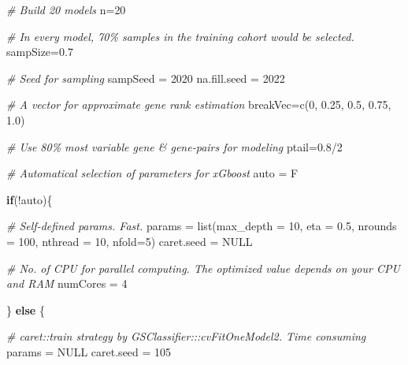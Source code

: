 \documentclass[
  12pt,
]{book}
\newenvironment{Shaded}{\begin{snugshade}}{\end{snugshade}}
\newcommand{\AttributeTok}[1]{\textcolor[rgb]{0.77,0.63,0.00}{#1}}
\newcommand{\CommentTok}[1]{\textcolor[rgb]{0.56,0.35,0.01}{\textit{#1}}}
\newcommand{\ConstantTok}[1]{\textcolor[rgb]{0.00,0.00,0.00}{#1}}
\newcommand{\ControlFlowTok}[1]{\textcolor[rgb]{0.13,0.29,0.53}{\textbf{#1}}}
\newcommand{\DecValTok}[1]{\textcolor[rgb]{0.00,0.00,0.81}{#1}}
\newcommand{\FloatTok}[1]{\textcolor[rgb]{0.00,0.00,0.81}{#1}}
\newcommand{\FunctionTok}[1]{\textcolor[rgb]{0.00,0.00,0.00}{#1}}
\newcommand{\NormalTok}[1]{#1}
\newcommand{\OtherTok}[1]{\textcolor[rgb]{0.56,0.35,0.01}{#1}}
\newcommand{\SpecialCharTok}[1]{\textcolor[rgb]{0.00,0.00,0.00}{#1}}
\begin{document}
\begin{Shaded}
\begin{Highlighting}[]

\CommentTok{\# Build 20 models}
\NormalTok{n}\OtherTok{=}\DecValTok{20} 

\CommentTok{\# In every model, 70\% samples in the training cohort would be selected. }
\NormalTok{sampSize}\OtherTok{=}\FloatTok{0.7}

\CommentTok{\# Seed for sampling}
\NormalTok{sampSeed }\OtherTok{=} \DecValTok{2020}
\NormalTok{na.fill.seed }\OtherTok{=} \DecValTok{2022}

\CommentTok{\# A vector for approximate gene rank estimation}
\NormalTok{breakVec}\OtherTok{=}\FunctionTok{c}\NormalTok{(}\DecValTok{0}\NormalTok{, }\FloatTok{0.25}\NormalTok{, }\FloatTok{0.5}\NormalTok{, }\FloatTok{0.75}\NormalTok{, }\FloatTok{1.0}\NormalTok{)}
  
\CommentTok{\# Use 80\% most variable gene \& gene{-}pairs for modeling}
\NormalTok{ptail}\OtherTok{=}\FloatTok{0.8}\SpecialCharTok{/}\DecValTok{2}

\CommentTok{\# Automatical selection of parameters for xGboost}
\NormalTok{auto }\OtherTok{=}\NormalTok{ F}

\ControlFlowTok{if}\NormalTok{(}\SpecialCharTok{!}\NormalTok{auto)\{}
      
      \CommentTok{\# Self{-}defined params. Fast.}
\NormalTok{      params }\OtherTok{=} \FunctionTok{list}\NormalTok{(}\AttributeTok{max\_depth =} \DecValTok{10}\NormalTok{,}
                    \AttributeTok{eta =} \FloatTok{0.5}\NormalTok{,}
                    \AttributeTok{nrounds =} \DecValTok{100}\NormalTok{,}
                    \AttributeTok{nthread =} \DecValTok{10}\NormalTok{,}
                    \AttributeTok{nfold=}\DecValTok{5}\NormalTok{)}
\NormalTok{      caret.seed }\OtherTok{=} \ConstantTok{NULL}
      
      \CommentTok{\# No. of CPU for parallel computing. The optimized value depends on your CPU and RAM}
\NormalTok{      numCores }\OtherTok{=} \DecValTok{4}
      
\NormalTok{    \} }\ControlFlowTok{else}\NormalTok{ \{}
      
      \CommentTok{\# caret::train strategy by GSClassifier:::cvFitOneModel2. Time consuming}
\NormalTok{      params }\OtherTok{=} \ConstantTok{NULL}
\NormalTok{      caret.seed }\OtherTok{=} \DecValTok{105}
      

\end{Highlighting}
\end{Shaded}
\end{document}
